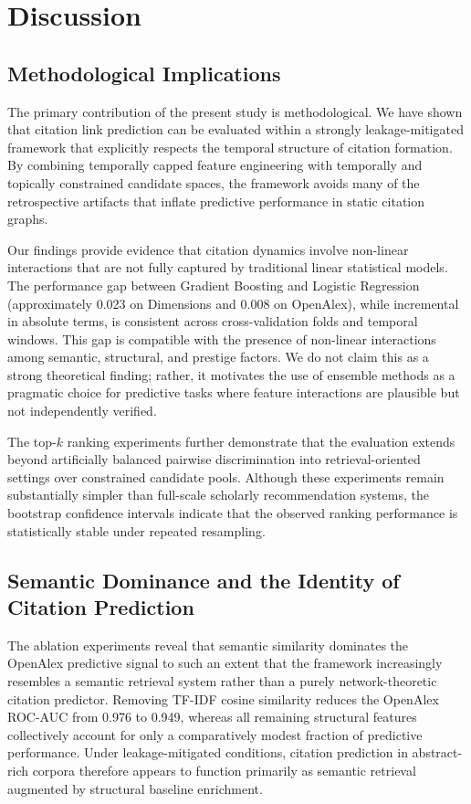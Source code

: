 \documentclass[11pt,a4paper]{article}
\begin{document}
\section{Discussion}
\label{sec:discussion}

\subsection{Methodological Implications}

The primary contribution of the present study is methodological. We have shown that citation link prediction can be evaluated within a strongly leakage-mitigated framework that explicitly respects the temporal structure of citation formation. By combining temporally capped feature engineering with temporally and topically constrained candidate spaces, the framework avoids many of the retrospective artifacts that inflate predictive performance in static citation graphs.

Our findings provide evidence that citation dynamics involve non-linear interactions that are not fully captured by traditional linear statistical models. The performance gap between Gradient Boosting and Logistic Regression (approximately 0.023 on Dimensions and 0.008 on OpenAlex), while incremental in absolute terms, is consistent across cross-validation folds and temporal windows. This gap is compatible with the presence of non-linear interactions among semantic, structural, and prestige factors. We do not claim this as a strong theoretical finding; rather, it motivates the use of ensemble methods as a pragmatic choice for predictive tasks where feature interactions are plausible but not independently verified.

The top-\(k\) ranking experiments further demonstrate that the evaluation extends beyond artificially balanced pairwise discrimination into retrieval-oriented settings over constrained candidate pools. Although these experiments remain substantially simpler than full-scale scholarly recommendation systems, the bootstrap confidence intervals indicate that the observed ranking performance is statistically stable under repeated resampling.

\subsection{Semantic Dominance and the Identity of Citation Prediction}

The ablation experiments reveal that semantic similarity dominates the OpenAlex predictive signal to such an extent that the framework increasingly resembles a semantic retrieval system rather than a purely network-theoretic citation predictor. Removing TF-IDF cosine similarity reduces the OpenAlex ROC-AUC from 0.976 to 0.949, whereas all remaining structural features collectively account for only a comparatively modest fraction of predictive performance. Under leakage-mitigated conditions, citation prediction in abstract-rich corpora therefore appears to function primarily as semantic retrieval augmented by structural baseline enrichment.
\end{document}
